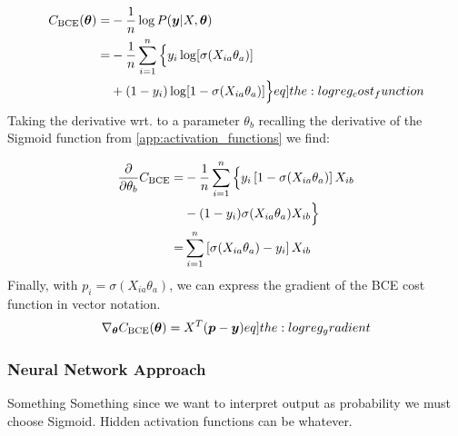         \begin{align}
            \msub{C}{BCE}(\vec{\theta}) =& - \frac{1}{n} \log P(\vec{y}|X,\vec{\vec{\theta}}) \nonumber \\ \nonumber
            =& - \frac{1}{n} \sum_{i = 1}^{n} \Big\{ y_i \log[\sigma(X_{ia} \theta_a)] \\
            &+ (1 - y_i)\log[1-\sigma(X_{ia}\theta_a)] \Big\}
            \label[eq]{the:logreg_cost_function}
        \end{align}
        Taking the derivative wrt. to a parameter $\theta_b$ recalling the derivative of the Sigmoid function from \cref{app:activation_functions} we find:

        \begin{align} \nonumber
            \pdv{\theta_b} \msub{C}{BCE} =& - \frac{1}{n} \sum_{i = 1}^{n} \Big\{ y_i \bclosed{1-\sigma(X_{ia} \theta_a)}X_{ib} \\ \nonumber
            &- (1-y_i)\sigma(X_{ia} \theta_a)X_{ib}  \Big\} \\
            =& \sum_{i=1}^n \bclosed{\sigma(X_{ia}\theta_a) - y_i}X_{ib}
        \end{align}
        Finally, with $p_i = \sigma(X_{ia}\theta_a)$, we can express the gradient of the BCE cost function in vector notation.
        \begin{align}
            \nabla_{\vec{\theta}} \msub{C}{BCE}(\vec{\theta}) = X^T (\vec{p} - \vec{y}) 
            \label[eq]{the:logreg_gradient}
        \end{align}


    \subsubsection{Neural Network Approach}
        Something Something since we want to interpret output as probability we must choose Sigmoid. Hidden activation functions can be whatever. 